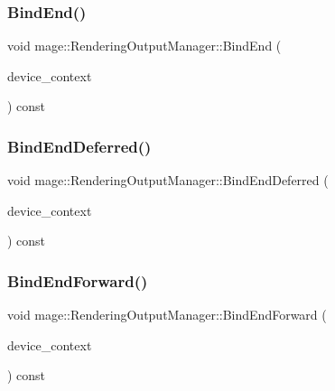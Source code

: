 \hypertarget{classmage_1_1_rendering_output_manager_adea6f5c57a7f817984380fb82b6a8f64}{}\label{classmage_1_1_rendering_output_manager_adea6f5c57a7f817984380fb82b6a8f64} 
\subsubsection{\texorpdfstring{Bind\+End()}{BindEnd()}}
{\footnotesize\ttfamily void mage\+::\+Rendering\+Output\+Manager\+::\+Bind\+End (\begin{DoxyParamCaption}\item[{I\+D3\+D11\+Device\+Context2 $\ast$}]{device\+\_\+context }\end{DoxyParamCaption}) const\hspace{0.3cm}{\ttfamily [noexcept]}}

\hypertarget{classmage_1_1_rendering_output_manager_a1572b24b1cc7b4344717af581d04fd75}{}\label{classmage_1_1_rendering_output_manager_a1572b24b1cc7b4344717af581d04fd75} 
\subsubsection{\texorpdfstring{Bind\+End\+Deferred()}{BindEndDeferred()}}
{\footnotesize\ttfamily void mage\+::\+Rendering\+Output\+Manager\+::\+Bind\+End\+Deferred (\begin{DoxyParamCaption}\item[{I\+D3\+D11\+Device\+Context2 $\ast$}]{device\+\_\+context }\end{DoxyParamCaption}) const\hspace{0.3cm}{\ttfamily [noexcept]}}

\hypertarget{classmage_1_1_rendering_output_manager_a48f4a463e23f0b80f5567919c54b0a6b}{}\label{classmage_1_1_rendering_output_manager_a48f4a463e23f0b80f5567919c54b0a6b} 
\subsubsection{\texorpdfstring{Bind\+End\+Forward()}{BindEndForward()}}
{\footnotesize\ttfamily void mage\+::\+Rendering\+Output\+Manager\+::\+Bind\+End\+Forward (\begin{DoxyParamCaption}\item[{I\+D3\+D11\+Device\+Context2 $\ast$}]{device\+\_\+context }\end{DoxyParamCaption}) const\hspace{0.3cm}{\ttfamily [noexcept]}}

